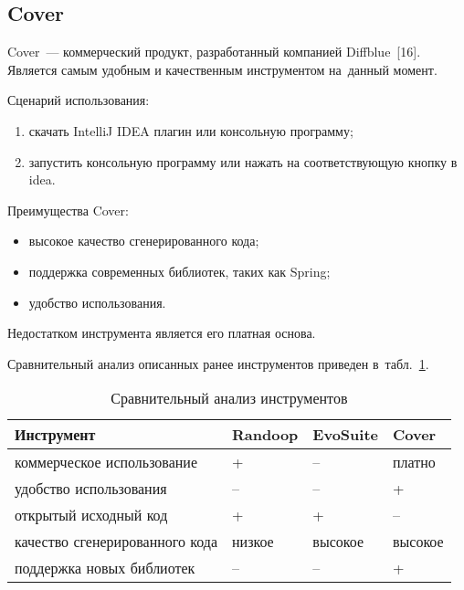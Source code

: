 \clearpage

\subsection{Cover}

Cover~--- коммерческий продукт, разработанный компанией Diffblue~[16]. Является самым удобным и качественным инструментом
на~данный момент.

Сценарий использования: 

\begin{enumerate}
	\item скачать IntelliJ IDEA плагин или консольную программу;
	\item запустить консольную программу или нажать на соответствующую кнопку в idea.
\end{enumerate}

Преимущества Cover: 

\begin{itemize}
	\item высокое качество сгенерированного кода;
	\item поддержка современных библиотек, таких как Spring;
	\item удобство использования.
\end{itemize}

Недостатком инструмента является его платная основа.


Сравнительный анализ описанных ранее инструментов приведен в~табл.~\ref{analys}.
\begin{table} [h!tbp]
	\centering
	\changecaptionwidth\captionwidth{14.75cm}
	\caption{Сравнительный анализ инструментов}\label{analys}%
	\begin{tabular}{| p{7cm} | p{2cm} | p{2cm} | p{2cm} |} \hline
		\textbf{Инструмент}							 	 		  &	\textbf{Randoop}	&	\textbf{EvoSuite}	&	\textbf{Cover}			\\ \hline
		коммерческое использование  					& 	+						   & 		--						& платно						\\ \hline
		удобство использования 					 			 & -- 							& -- 							 & +						      	\\ \hline
		открытый исходный код 					 			  & +							& +							      & --						      	\\ \hline
		качество сгенерированного кода 			    	 & низкое				  & высокое					   & высокое					\\ \hline
		поддержка новых библиотек  	                       & --				            & --					   		   & +						 		\\ \hline
	\end{tabular}
\end{table}	 
























